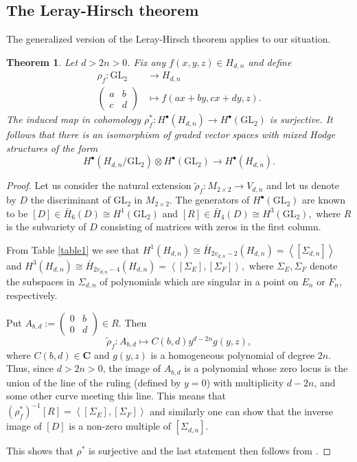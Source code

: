\documentclass[10pt,a4paper,twoside]{amsart}
\theoremstyle{plain}
\newtheorem{theo}{Theorem}[section]
\theoremstyle{definition}
\theoremstyle{remark}
\begin{document}
\subsection{The Leray-Hirsch theorem}\label{sec-LH}
The generalized version of the Leray-Hirsch theorem applies to our situation.
\begin{theo}\label{divisibility} Let 
$d>2n>0$. Fix any $f(x,y,z) \in H_{d,n}$ and define  
    \begin{align*}
	\rho_f: \mathrm{GL}_2&\rightarrow H_{d,n}\\
	\begin{pmatrix}
	   a&b\\c&d
	\end{pmatrix}&\mapsto f(ax+by,cx+dy,z).
    \end{align*}
The induced map in cohomology $\rho_f^*:H^\bullet(H_{d,n})\rightarrow H^\bullet(\mathrm{GL}_2)$ is surjective. 
It follows that there is an isomorphism of graded vector spaces with mixed Hodge structures of the form 
  \[
    H^\bullet(H_{d,n}/\mathrm{GL}_2)\otimes H^\bullet(\mathrm{GL}_2)\rightarrow H^\bullet(H_{d,n}).
  \]
\end{theo} 
\begin{proof} 
    Let us consider the natural extension $\tilde{\rho}_f:M_{2\times2}\rightarrow V_{d,n}$ and let us denote by $D$ the discriminant of $\mathrm{GL}_2$ in $M_{2\times2}.$
    The generators of $H^\bullet(\mathrm{GL}_2)$ are known to be $\left[D\right]\in\bar{H}_6(D)\cong H^1(\mathrm{GL}_2)$ and $\left[R\right]\in\bar{H}_4(D)\cong H^3(\mathrm{GL}_2),$ where $R$ is the subvariety of $D$ consisting of matrices with zeros in the first column.
		
    From Table \ref{table1} we see that $H^1(H_{d,n})\cong\bar{H}_{2v_{d,n}-2}(H_{d,n})=\left\langle\left[\Sigma_{d,n}\right]\right\rangle$ and $H^3(H_{d,n})\cong\bar{H}_{2v_{d,n}-4}(H_{d,n})=\left\langle\left[\Sigma_E\right],\left[\Sigma_F\right]\right\rangle,$ where $\Sigma_E, \Sigma_F$ denote the subspaces in $\Sigma_{d,n}$ of polynomials which are singular in a point on $E_n$ or $F_n,$ respectively.
		
    Put $A_{b,d}:=\begin{pmatrix}0&b\\0&d\end{pmatrix}\in R$. Then 
    $$\tilde{\rho}_f:A_{b,d}\mapsto C(b,d)y^{d-2n}g(y,z),$$
    where $C(b,d)\in\mathbf{C}$ and $g(y,z)$ is a homogeneous polynomial of degree $2n$. 
    Thus, since $d > 2n>0$, the image of $A_{b,d}$ is a polynomial whose zero locus is the union of the line of the ruling (defined by $y=0$) with multiplicity $d-2n$, and some other curve meeting this line.
    This means that $(\rho^*_f)^{-1}\left[R\right]=\left\langle\left[\Sigma_E\right],\left[\Sigma_F\right]\right\rangle$ and similarly one can show that the inverse image of $\left[D\right]$ is a non-zero multiple of $\left[\Sigma_{d,n}\right].$
  
    This shows that $\rho^*$ is surjective and the last statement then follows from \cite[Theorem 3]{PS03}.
\end{proof}
\end{document}
